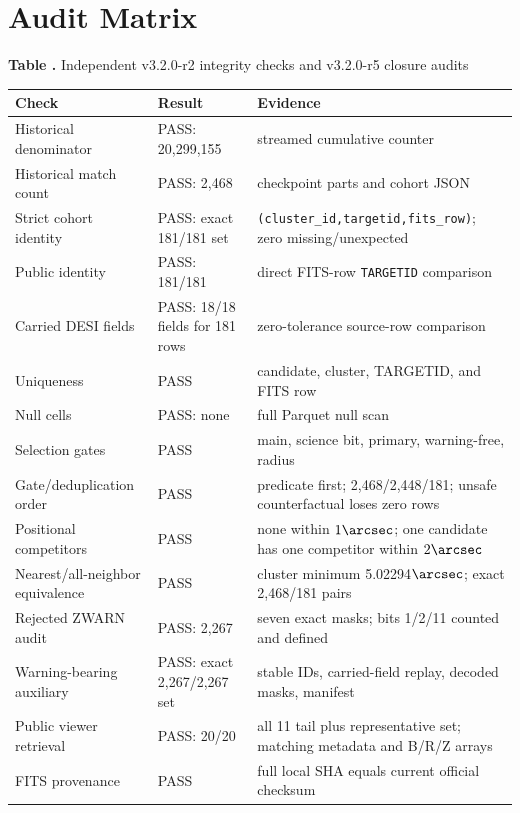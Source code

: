 \documentclass[twocolumn]{aastex701}
\newcommand{\paperVersion}{v3.2.0-r5}
\newcommand{\releaseVersion}{v3.2.0-r2}
\begin{document}
\section{Audit Matrix}\label{app:audit}

\label{tab:audit}
\begin{center}
\textbf{Table \thetable.} Independent \releaseVersion{} integrity checks and \paperVersion{} closure audits

\smallskip
\scriptsize
\begin{tabular}{p{}p{}p{}}
\toprule
Check & Result & Evidence \\
\midrule
Historical denominator & PASS: 20,299,155 & streamed cumulative counter \\
Historical match count & PASS: 2,468 & checkpoint parts and cohort JSON \\
Strict cohort identity & PASS: exact 181/181 set & \texttt{(cluster\_id,targetid,fits\_row)}; zero missing/unexpected \\
Public identity & PASS: 181/181 & direct FITS-row \texttt{TARGETID} comparison \\
Carried DESI fields & PASS: 18/18 fields for 181 rows & zero-tolerance source-row comparison \\
Uniqueness & PASS & candidate, cluster, TARGETID, and FITS row \\
Null cells & PASS: none & full Parquet null scan \\
Selection gates & PASS & main, science bit, primary, warning-free, radius \\
Gate/deduplication order & PASS & predicate first; 2,468/2,448/181; unsafe counterfactual loses zero rows \\
Positional competitors & PASS & none within $1\arcsec$; one candidate has one competitor within $2\arcsec$ \\
Nearest/all-neighbor equivalence & PASS & cluster minimum 5.02294$\arcsec$; exact 2,468/181 pairs \\
Rejected ZWARN audit & PASS: 2,267 & seven exact masks; bits 1/2/11 counted and defined \\
Warning-bearing auxiliary & PASS: exact 2,267/2,267 set & stable IDs, carried-field replay, decoded masks, manifest \\
Public viewer retrieval & PASS: 20/20 & all 11 tail plus representative set; matching metadata and B/R/Z arrays \\
FITS provenance & PASS & full local SHA equals current official checksum \\

\end{tabular}
\end{center}
\end{document}
